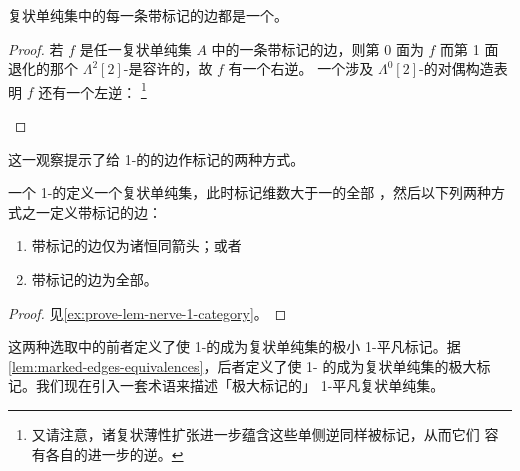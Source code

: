 \begin{lemma}\label{lem:marked-edges-equivalences}
复状单纯集中的每一条带标记的边都是一个\trEquivalence。
\end{lemma}

\begin{proof}
若 $f$ 是任一复状单纯集 $A$ 中的一条带标记的边，则第 0 面为 $f$ 而第 1 面
退化的那个 $\Lambda^{2}[2]$-\trHorn{}是容许的，故 $f$ 有一个右\trEquivalence{}逆。
一个涉及 $\Lambda^{0}[2]$-\trHorn{}的对偶构造表明 $f$ 还有一个左\trEquivalence{}逆：%
\footnote{又请注意，诸复状薄性扩张进一步蕴含这些单侧逆同样被标记，从而它们
容有各自的进一步的逆。}
\begin{center}
\qquad
{}
\end{center}
\end{proof}

这一观察提示了给 1-\trCategory{}的\trNerve{}的边作标记的两种方式。

\begin{lemma}\label{lem:nerve-1-category-complicial}
一个 1-\trCategory{}的\trNerve{}定义一个复状单纯集，此时标记维数大于一的全部%
\trSimplex，然后以下列两种方式之一定义带标记的边：
\begin{enumerate}[label=(\roman*)]
\item 带标记的边仅为诸恒同箭头；或者
\item 带标记的边为全部\trIsomorphism。
\end{enumerate}
\end{lemma}

\begin{proof}
见\cref{ex:prove-lem-nerve-1-category}。
\end{proof}

这两种选取中的前者定义了使 1-\trCategory{}的\trNerve{}成为复状单纯集的极小
1-平凡标记。据\cref{lem:marked-edges-equivalences}，后者定义了使 1-\trCategory{}%
的\trNerve{}成为复状单纯集的极大标记。我们现在引入一套术语来描述「极大标记的」
1-平凡复状单纯集。

